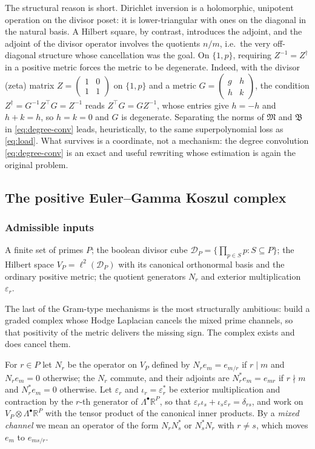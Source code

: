 \documentclass[11pt]{amsart}
\theoremstyle{definition}
\theoremstyle{remark}
\theoremstyle{definition}
\newcommand{\eps}{\varepsilon}
\newcommand{\R}{\mathbb{R}}
\begin{document}
\noindent The structural reason is short. Dirichlet inversion is a holomorphic, unipotent
operation on the divisor poset: it is lower-triangular with ones on the diagonal in the natural
basis. A Hilbert square, by contrast, introduces the adjoint, and the adjoint of the divisor
operator involves the quotients $n/m$, i.e.\ the very off-diagonal structure whose cancellation
was the goal. On $\{1,p\}$, requiring $Z^{-1}=Z^{\dagger}$ in a positive metric forces the
metric to be degenerate. Indeed, with the divisor (zeta) matrix
$Z=\begin{pmatrix}1&0\\1&1\end{pmatrix}$ on $\{1,p\}$ and a metric
$G=\begin{pmatrix}g&h\\h&k\end{pmatrix}$, the condition $Z^{\dagger}=G^{-1}Z^{\top}G=Z^{-1}$ reads
$Z^{\top}G=GZ^{-1}$, whose entries give $h=-h$ and $h+k=h$, so $h=k=0$ and $G$ is degenerate.
Separating the norms of $\mathfrak M$ and $\mathfrak B$
in \eqref{eq:degree-conv} leads, heuristically, to the same superpolynomial loss as
\eqref{eq:load}. What survives
is a coordinate, not a mechanism: the degree convolution \eqref{eq:degree-conv} is an exact and
useful rewriting whose estimation is again the original problem.

\subsection{The positive Euler--Gamma Koszul complex}\label{sec:koszul}

\subsubsection*{Admissible inputs}
A finite set of primes $P$; the boolean divisor cube
$\mathcal D_P=\{\prod_{p\in S}p:S\subseteq P\}$; the Hilbert space
$V_P=\ell^2(\mathcal D_P)$ with its canonical orthonormal basis and the ordinary positive metric;
the quotient generators $N_r$ and exterior multiplication $\eps_r$.

The last of the Gram-type mechanisms is the most structurally ambitious: build a graded complex
whose Hodge Laplacian cancels the mixed prime channels, so that positivity of the metric
delivers the missing sign. The complex exists and does cancel them.

For $r\in P$ let $N_r$ be the operator on $V_P$ defined by $N_re_m=e_{m/r}$ if $r\mid m$ and
$N_re_m=0$ otherwise; the $N_r$ commute, and their adjoints are $N_r^*e_m=e_{mr}$ if $r\nmid m$ and
$N_r^*e_m=0$ otherwise. Let $\eps_r$ and $\iota_r=\eps_r^*$ be exterior multiplication and
contraction by the $r$-th generator of $\Lambda^\bullet\R^P$, so that
$\eps_r\iota_s+\iota_s\eps_r=\delta_{rs}$, and work on $V_P\otimes\Lambda^\bullet\R^P$ with the
tensor product of the canonical inner products. By a \emph{mixed channel} we mean an operator of
the form $N_rN_s^*$ or $N_s^*N_r$ with $r\ne s$, which moves $e_m$ to $e_{ms/r}$.
\end{document}
